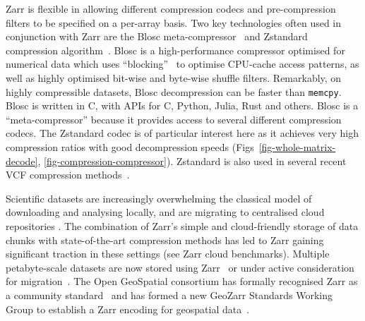\documentclass[a4paper,num-refs]{oup-contemporary}
\begin{document}
Zarr is flexible in allowing different compression codecs and
pre-compression filters to be specified on a per-array basis.
Two key technologies often used in conjunction with Zarr are the Blosc
meta-compressor~\cite{alted2010modern}
and Zstandard compression algorithm~\citep{collet2021rfc}.
Blosc is a high-performance compressor optimised for numerical
data which uses ``blocking''~\citep{alted2010modern} to
optimise CPU-cache access patterns, as well as highly optimised
bit-wise and byte-wise shuffle filters.  Remarkably, on highly
compressible datasets, Blosc decompression can be faster
than \texttt{memcpy}.
Blosc is written in C, with APIs for C, Python, Julia, Rust
and others.
Blosc is a ``meta-compressor'' because it provides
access to several different compression codecs. The
Zstandard codec is of particular
interest here as it achieves very high compression ratios
with good decompression speeds (Figs~\ref{fig-whole-matrix-decode},
\ref{fig-compression-compressor}).
Zstandard is also used in several recent VCF compression
methods~\citep[e.g.][]{lefaive2021sparse,wertenbroek2022xsi}.

Scientific datasets are increasingly overwhelming the classical
model of downloading and analysing locally, and are migrating to
centralised cloud repositories \citep{abernathey2021cloud,moore2021ome}.
The combination of Zarr's simple and cloud-friendly storage
of data chunks with state-of-the-art compression methods has
led to Zarr gaining significant traction in these settings
(see \citep{durbin2020task,moore2021ome,gowan2022using} 
Zarr cloud benchmarks).
Multiple petabyte-scale datasets are now stored using
Zarr~\cite[e.g.][]{gowan2022using, %
fahnestock2023mappin, %
cmip6_dataset}
or under active consideration for migration~\citep{durbin2020task,abernathey2021opening}.
The Open GeoSpatial consortium has formally recognised Zarr as a community
standard~\cite{ogc_zarr2_standard}
and has formed
a new GeoZarr Standards Working Group to establish a Zarr encoding for
geospatial data~\cite{ogc_geozarr_news}.
\end{document}

